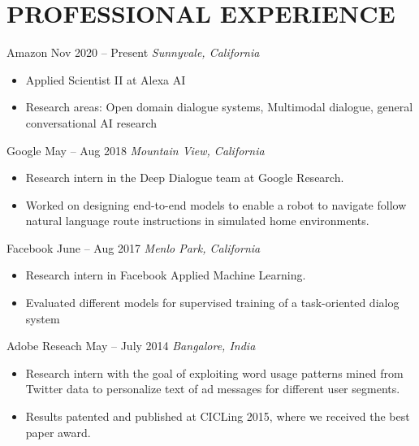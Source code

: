 \documentclass[letterpaper,10pt]{resume}
\begin{document}
{\begin{itemize}
\end{itemize}

\section{PROFESSIONAL EXPERIENCE}

\begin{itemize}
   \credential
      {Amazon} {Nov 2020 -- Present}
      {\textit{Sunnyvale, California}} {}
      {
		\small \begin{itemize}
			\item{Applied Scientist II at Alexa AI}
			\item{Research areas: Open domain dialogue systems, Multimodal dialogue, general conversational AI research}
		\end{itemize}		      
      }
  \vspace{0.2cm}

   \credential
      {Google} {May -- Aug 2018}
      {\textit{Mountain View, California}} {}
      {
		\small \begin{itemize}
			\item{Research intern in the Deep Dialogue team at Google Research.}
			\item{Worked on designing end-to-end models to enable a robot to navigate follow natural language route instructions in simulated home environments.}
		\end{itemize}		      
      }
  \vspace{0.2cm}
  
   \credential
      {Facebook} {June -- Aug 2017}
      {\textit{Menlo Park, California}} {}
      {
		\small \begin{itemize}
			\item{Research intern in Facebook Applied Machine Learning.}
			\item{Evaluated different models for supervised training of a task-oriented dialog system}
		\end{itemize}		      
      }
  \vspace{0.2cm}


   \credential
      {Adobe Reseach} {May -- July 2014}
      {\textit{Bangalore, India}} {}
      {
		\small \begin{itemize}
			\item{Research intern with the goal of exploiting word usage patterns mined from Twitter data to personalize text of ad messages for different user segments.}
			\item{Results patented and published at CICLing 2015, where we received the best paper award.}
		\end{itemize}		      
      }
  \vspace{0.2cm}


\end{itemize}}
\end{document}
